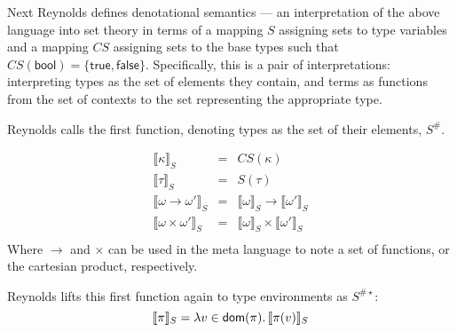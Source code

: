 \documentclass{article}
\begin{document}
Next Reynolds defines denotational semantics --- an interpretation of the above language into set
theory in terms of a mapping $S$ assigning sets to type variables and a mapping $CS$ assigning sets
to the base types such that $CS(\mathsf{bool})=\{\mathsf{true},\mathsf{false}\}$.  Specifically, this is a pair of
interpretations: interpreting types as the set of elements they contain, and terms as functions from
the set of contexts to the set representing the appropriate type.

Reynolds calls the first function, denoting types as the set of their elements, $S^\#$.

\newcommand{\denote}[2]{\ensuremath{\llbracket #1 \rrbracket_{#2}}}
\[
    \begin{array}{rcl}
        \denote{\kappa}{S} & = & CS(\kappa)\\
        \denote{\tau}{S} & = & S(\tau)\\
        \denote{\omega\rightarrow\omega'}{S} & = & \denote{\omega}{S}\rightarrow\denote{\omega'}{S}\\
        \denote{\omega\times\omega'}{S} & = & \denote{\omega}{S}\times\denote{\omega'}{S}\\
    \end{array}
\]
Where $\rightarrow$ and $\times$ can be used in the meta language to note a set of functions, or the
cartesian product, respectively.

Reynolds lifts this first function again to type environments as $S^{\#\star}$:
\[
    \denote{\pi}{S} = \lambda {v\in\mathsf{dom}(\pi)}\ldotp\denote{\pi(v)}{S}
\]
\end{document}
